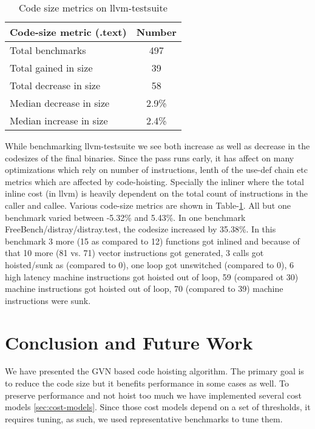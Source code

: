 \documentclass{sig-alternate}
\begin{document}
\begin{table}[h!]
  \begin{center}
    \begin{tabular}{|l|c|}
      \hline
      Code-size metric  (.text)                   & Number   \\\hline
      Total  benchmarks                           & 497      \\\hline
      Total  gained in size                       & 39       \\\hline
      Total  decrease in size                     & 58       \\\hline
      Median decrease in size                     & 2.9\%    \\\hline
      Median increase in size                     & 2.4\%    \\\hline
    \end{tabular}
  \end{center}
  \caption{Code size metrics on llvm-testsuite}
  \label{tab:code-size}
\end{table}

While benchmarking llvm-testsuite we see both increase as well as decrease in
the codesizes of the final binaries. Since the pass runs early, it has affect on
many optimizations which rely on number of instructions, lenth of the use-def
chain etc metrics which are affected by code-hoisting. Specially the inliner
where the total inline cost (in llvm) is heavily dependent on the total count of
instructions in the caller and callee. Various code-size metrics are shown in
Table-\ref{tab:code-size}. All but one benchmark varied between -5.32\% and
5.43\%.  In one benchmark FreeBench/distray/distray.test, the codesize increased
by 35.38\%. In this benchmark 3 more (15 as compared to 12) functions got
inlined and because of that 10 more (81 vs. 71) vector instructions got
generated, 3 calls got hoisted/sunk as (compared to 0), one loop got unswitched
(compared to 0), 6 high latency machine instructions got hoisted out of loop, 59
(compared ot 30) machine instructions got hoisted out of loop, 70 (compared to
39) machine instructions were sunk.

\section{Conclusion and Future Work}
\label{sec:future-work}
We have presented the GVN based code hoisting algorithm. The primary goal is to
reduce the code size but it benefits performance in some cases as well. To
preserve performance and not hoist too much we have implemented several cost
models \ref{sec:cost-models}. Since those cost models depend on a set of thresholds,
it requires tuning, as such, we used representative benchmarks to tune them.
\end{document}
